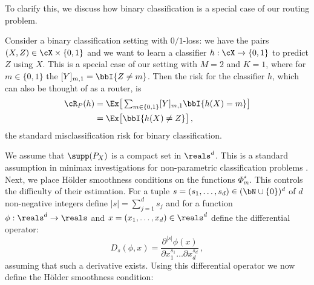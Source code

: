 To clarify this, we discuss how binary classification is a special case of our routing problem. %

\begin{example} \label{example:binary-classification}
    Consider a binary classification setting with $0/1$-loss: we have the pairs $(X, Z) \in \cX \times \{0, 1\}$ and we want to learn a classifier $h: \cX \to\{0, 1\} $ to predict $Z$ using $X$. This is a special case of our setting with $M = 2$ and $K= 1$, where for $m \in \{0, 1\}$ the $[Y]_{m, 1} = \bbI\{Z \neq m\}$. Then the risk for the classifier $h$, which can also be thought of as a router, is 
\begin{align*}
\textstyle \cR_P(h) & \textstyle = \Ex\big[\sum_{m \in \{0, 1\}}[Y]_{m, 1} \bbI\{h(X) = m\} \big]\\ 
& = \Ex\big[ \bbI\{h(X) \neq Z\} \big]\,,
\end{align*} the standard misclassification risk for binary classification. 
\end{example}


We assume that $\supp(P_X)$ is a compact set in $\reals^d$. This is a standard assumption in minimax investigations for non-parametric classification problems \citep{audibert2007Fast,cai2019Transfer,kpotufe2018Marginal,maity2022minimax}. 
Next,  we place H\"older smoothness conditions on the functions $\Phi_m^\star$. This controls the difficulty of their estimation. For a tuple $s = (s_1 , \dots, s_d) \in (\bN \cup \{0\})^d$ of $d$ non-negative integers  define $|s| = \sum_{j = 1}^d s_j$ and for a function $\phi: \reals^d\to \reals$ and $x = (x_1, \dots, x_d) \in \reals^d$ define the differential operator: 
\begin{equation}
  \textstyle  D_s(\phi, x) = \frac{\partial^{|s|}\phi(x)}{\partial x_1^{s_1} \dots \partial x_d^{s_d}}\,, 
\end{equation} assuming that such a derivative exists. Using this differential operator we now define the H\"older smoothness condition: 

